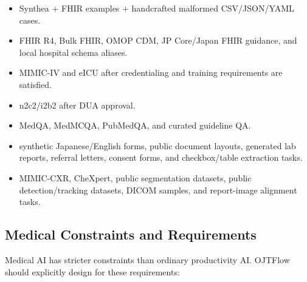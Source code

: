 \begin{itemize}
  \item {} Synthea + FHIR examples + handcrafted malformed CSV/JSON/YAML cases.
  \item {} FHIR R4, Bulk FHIR, OMOP CDM, JP Core/Japan FHIR guidance, and local hospital schema aliases.
  \item {} MIMIC-IV and eICU after credentialing and training requirements are satisfied.
  \item {} n2c2/i2b2 after DUA approval.
  \item {} MedQA, MedMCQA, PubMedQA, and curated guideline QA.
  \item {} synthetic Japanese/English forms, public document layouts, generated lab reports, referral letters, consent forms, and checkbox/table extraction tasks.
  \item {} MIMIC-CXR, CheXpert, public segmentation datasets, public detection/tracking datasets, DICOM samples, and report-image alignment tasks.
\end{itemize}

\subsection{Medical Constraints and Requirements}

Medical AI has stricter constraints than ordinary productivity AI. OJTFlow should explicitly design for these requirements:

